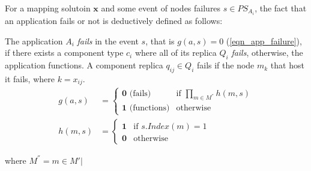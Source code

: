 For a mapping solutoin $\textbf{x}$ and some event of nodes failures $s\in PS_{A_i}$, the fact that an application fails or not is deductively defined as follows:
\begin{definition}
The application $A_i$ \textit{fails}  in the event $s$, that is $g(a, s)=0$ (\ref{eqn_app_failure}), if there exists a component type $c_i$ where all of its replica $Q_i$ \textit{fails}, otherwise, the application functions.  A component replica $q_{ij}\in Q_i$ fails if the node $m_k$ that host it fails, where $k=x_{ij}$. 
\begin{align}
\label{eqn_app_failure}
g(a, s)&=
\begin{cases}
\textbf{0} \mbox{ (fails)} & \mbox{if }  \prod_{m\in M^{''}}{h(m,s)}\\
\textbf{1} \mbox{ (functions)} & \mbox{otherwise }
\end{cases}\\
\label{eqn_appreliability_node}
h(m, s)&=
\begin{cases}
\textbf{1} & \mbox{if } s.Index(m) = 1\\
\textbf{0} & \mbox{otherwise }
\end{cases}
\end{align}

where $M^{''}={m\in M'|}$
\end{definition}

